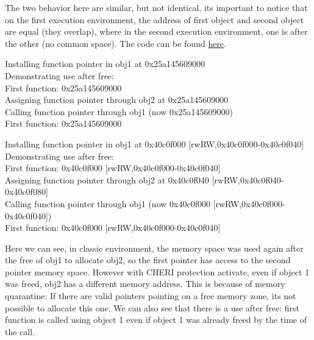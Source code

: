 \documentclass[a4paper, 11pt]{article}
\begin{document}
		
	
	
		The two behavior here are similar, but not identical, its important to notice that on the first execution environment, the address of first object and second object are equal (they overlap), where in the second execution environment, one is after the other (no common space).
		The code can be found \href{https://ctsrd-cheri.github.io/cheri-exercises/exercises/cheri-allocator/index.html}{here}.
		\begin{tcolorbox}[colback=gray!5!white, colframe=gray!75!black, title=Output on classic \Gls{risc-v} environment (no CHERI Protection)]
			Installing function pointer in obj1 at 0x25a145609000\\
			Demonstrating use after free:\\
			First function: 0x25a145609000\\
			Assigning function pointer through obj2 at 0x25a145609000\\
			Calling function pointer through obj1 (now 0x25a145609000)\\
			First function: 0x25a145609000
		\end{tcolorbox}
		\begin{tcolorbox}[colback=gray!5!white, colframe=blue!75!black, title=Output on CHERI protected environment]
			Installing function pointer in obj1 at 0x40c0f000 [rwRW,0x40c0f000-0x40c0f040]\\
			Demonstrating use after free:\\
			First function: 0x40c0f000 [rwRW,0x40c0f000-0x40c0f040]\\
			Assigning function pointer through obj2 at 0x40c0f040 [rwRW,0x40c0f040-0x40c0f080]\\
			Calling function pointer through obj1 (now 0x40c0f000  [rwRW,0x40c0f000-0x40c0f040])\\
			First function: 0x40c0f000 [rwRW,0x40c0f000-0x40c0f040]
		\end{tcolorbox}
		Here we can see, in classic environment, the memory space was used again after the free of obj1 to allocate obj2, so the first pointer has access to the second pointer memory space. However with CHERI protection activate, even if object 1 was freed, obj2 has a different memory address.
		This is because of memory quarantine: If there are valid pointers pointing on a free memory zone, its not possible to allocate this one.
		We can also see that there is a use after free: first function is called using object 1 even if object 1 was already freed by the time of the call.
\end{document}
